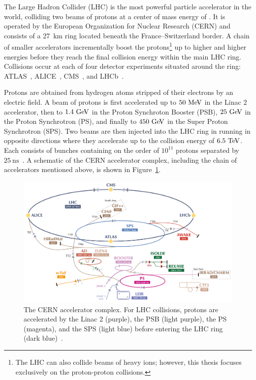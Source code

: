 ﻿The Large Hadron Collider (LHC) \cite{2008.LHC} is the most powerful particle accelerator in the world, colliding two beams of protons at a center of mass energy of .
It is operated by the European Organization for Nuclear Research (CERN) and consists of a 27~km ring located beneath the France--Switzerland border.
A chain of smaller accelerators incrementally boost the protons\footnote{The LHC can also collide beams of heavy ions; however, this thesis focuses exclusively on the proton-proton collisions.} up to higher and higher energies before they reach the final collision energy within the main LHC ring.
Collisions occur at each of four detector experiments situated around the ring: ATLAS~\cite{PERF-2007-01}, ALICE~\cite{2008.alice}, CMS~\cite{2008.cms}, and LHCb~\cite{2008.lhcb}.

Protons are obtained from hydrogen atoms stripped of their electrons by an electric field.
A beam of protons is first accelerated up to $50\mev$ in the Linac 2 accelerator, then to $1.4\gev$ in the Proton Synchroton Booster (PSB), $25\gev$ in the Proton Synchrotron (PS), and finally to $450\gev$ in the Super Proton Synchrotron (SPS).
Two beams are then injected into the LHC ring in running in opposite directions where they accelerate up to the collision energy of $6.5\tev$.
Each consists of bunches containing on the order of $10^{11}$ protons separated by $25~\textrm{ns}$~\cite{2019.accelerator-complex}.
A schematic of the CERN accelerator complex, including the chain of accelerators mentioned above, is shown in Figure~\ref{fig:detector_accelerator_complex}.

\begin{figure}
  \centering
  \includegraphics[width=.9\textwidth]{figs/detector/accelerator-complex-small}
  \caption[The CERN accelerator complex.  For LHC collisions, protons are accelerated by the Linac 2 (purple), the PSB (light purple), the PS (magenta), and the SPS (light blue) before entering the LHC ring (dark blue).]{The CERN accelerator complex.  For LHC collisions, protons are accelerated by the Linac 2 (purple), the PSB (light purple), the PS (magenta), and the SPS (light blue) before entering the LHC ring (dark blue)~\cite{2016.accelerator-image}.}
  \label{fig:detector_accelerator_complex}
\end{figure}

